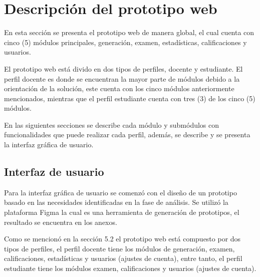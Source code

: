 \documentclass[../Main.tex]{subfiles}
\begin{document}
\section{Descripción del prototipo web}
    \begin{justify}
    En esta sección se presenta el prototipo web de manera global, el cual cuenta con cinco (5) módulos principales, generación, examen, estadísticas, calificaciones y usuarios.
    
    El prototipo web está divido en dos tipos de perfiles, docente y estudiante. El perfil docente es donde se encuentran la mayor parte de módulos debido a la orientación de la solución, este cuenta con los cinco módulos anteriormente mencionados, mientras que el perfil estudiante cuenta con tres (3) de los cinco (5) módulos.
    
    En las siguientes secciones se describe cada módulo y submódulos con funcionalidades que puede realizar cada perfil, además, se describe y se presenta la interfaz gráfica de usuario.
    \end{justify}
    
    \subsection{Interfaz de usuario}
    \begin{justify}
    Para la interfaz gráfica de usuario se comenzó con el diseño de un prototipo basado en las necesidades identificadas en la fase de análisis. Se utilizó la plataforma Figma la cual es una herramienta de generación de prototipos, el resultado se encuentra en los anexos.
    
    Como se mencionó en la sección 5.2 el prototipo web está compuesto por dos tipos de perfiles, el perfil docente tiene los módulos de generación, examen, calificaciones, estadísticas y usuarios (ajustes de cuenta), entre tanto, el perfil estudiante tiene los módulos examen, calificaciones y usuarios (ajustes de cuenta).
    \end{justify}
    
\end{document}
